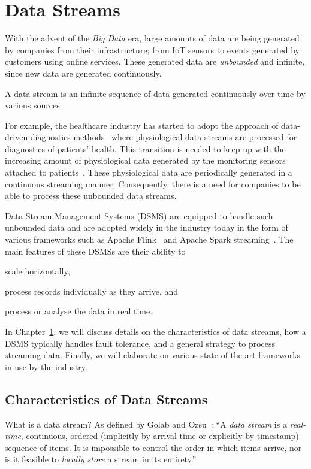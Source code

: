 \chapter{Data Streams} 
\label{chap:data_stream_processing}
With the advent of the \emph{Big Data} era, large amounts of data are being generated 
by companies from their infrastructure; from IoT sensors to events 
generated by customers using online services.
These generated data 
are \emph{unbounded} and infinite, since 
new data are generated continuously. 
\begin{defn}
   A data stream is an infinite sequence of data generated continuously 
   over time by various sources.  
\end{defn}

For example, the healthcare industry has started to 
adopt the approach of data-driven diagnostics methods~\cite{hospital_diagnosis} where 
physiological data streams are processed for diagnostics of patients' health. 
This transition is needed to keep up with the increasing amount 
of physiological data generated by the monitoring sensors attached to
patients~\cite{hospital_data_monitoring}. These physiological data are periodically
generated in a continuous streaming manner. 
Consequently, there is a need for 
companies to be able to process these unbounded data streams.

Data Stream Management Systems (DSMS)
are equipped to handle such unbounded data and are adopted 
widely in the industry today in the form of various frameworks such as Apache Flink~\cite{flink} and 
Apache Spark streaming~\cite{spark_streaming}.
The main features of these DSMSs are their ability to 
\renewcommand{\labelenumi}{(\roman{enumi})}
\begin{enumerate*}
    \item scale horizontally, 
    \item process records individually as they arrive, and
    \item process or analyse the data in real time.
\end{enumerate*}

In Chapter~\ref{chap:data_stream_processing}, we will discuss details on  
the characteristics of data streams, how a DSMS typically handles fault tolerance, and
a general strategy to process streaming data. Finally, we will elaborate on
various state-of-the-art frameworks in use by the industry.

\section{Characteristics of Data Streams}
\label{sec:characteristics_data_stream}
What is a data stream? As defined by Golab and Ozsu~\cite{golab_data_stream}:
“A \emph{data stream} is a \emph{real-time}, continuous, ordered (implicitly by arrival time 
or explicitly by timestamp) sequence of items. It is impossible to control the order
in which items arrive, nor is it feasible to \emph{locally store} a stream in its entirety.”

